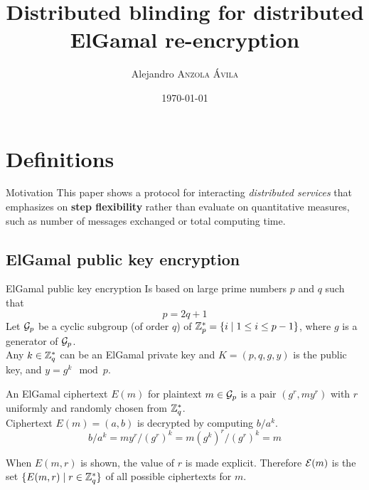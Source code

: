 \documentclass[10pt]{beamer}
\title{Distributed blinding for distributed ElGamal re-encryption}
\date{\today}
\institute{Boise State University}
\begin{document}
\author{Alejandro \textsc{Anzola \'Avila}}


\maketitle




\section{Definitions}
\begin{frame}{Motivation}
  This paper shows a protocol for interacting \emph{distributed services} that emphasizes on \textbf{step flexibility} rather than evaluate on quantitative measures, such as number of messages exchanged or total computing time.
\end{frame}

\subsection{ElGamal public key encryption}
\begin{frame}[allowframebreaks]{ElGamal public key encryption}
  Is based on large prime numbers $p$ and $q$ such that
  \begin{equation*}
    p = 2q +1
  \end{equation*}
  Let ${\mathcal{G}}_p$ be a cyclic subgroup (of order $q$) of $\mathbb{Z}_p^{\ast} = \{i \mid 1 \le i \le p-1\}$, where $g$ is a generator of ${\mathcal{G}}_p$. \\
  Any $k\in\mathbb{Z}_q^{\ast}$ can be an ElGamal private key and $K = (p, q, g, y)$ is the public key, and $y = g^{k} \mod p$.

  \framebreak

  An ElGamal ciphertext $E(m)$ for plaintext $m\in{\mathcal{G}}_p$ is a pair $(g^r, my^{r})$ with $r$ uniformly and randomly chosen from $\mathbb{Z}_q^{\ast}$. \\
  Ciphertext $E(m) = (a, b)$ is decrypted by computing $b / a^k$.
  \begin{equation*}
    b/a^k = my^{r} / {(g^{r})}^{k} = m {(g^k)}^r / {(g^r)}^k = m
  \end{equation*}

  When $E(m, r)$ is shown, the value of $r$ is made explicit. Therefore ${\mathcal{E}}(m)$ is the set $\{ E(m, r) \mid r \in \mathbb{Z}_q^{\ast} \}$ of all possible ciphertexts for $m$.
\end{frame}
\end{document}
